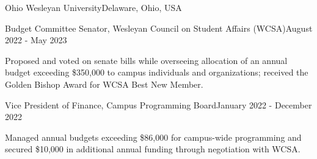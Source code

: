 \documentclass[10pt, letterpaper]{article}
\begin{document}
\begin{leadershipentry}{Ohio Wesleyan University}{Delaware, Ohio, USA}
	\begin{positionentry}{Budget Committee Senator, Wesleyan Council on Student Affairs (WCSA)}{August 2022 - May 2023}
		\item Proposed and voted on senate bills while overseeing allocation of an annual budget exceeding \$350,000 to campus individuals and organizations; received the Golden Bishop Award for WCSA Best New Member.
	\end{positionentry}
	\begin{positionentry}{Vice President of Finance, Campus Programming Board}{January 2022 - December 2022}
		\item Managed annual budgets exceeding \$86,000 for campus-wide programming and secured \$10,000 in additional annual funding through negotiation with WCSA.
	\end{positionentry}
\end{leadershipentry}

\vspace{\headerSpacing}

\section{}
\end{document}
